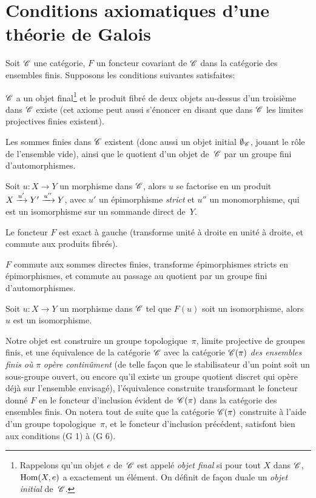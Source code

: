 \section{Conditions axiomatiques d'une th\'eorie de Galois}
\label{V.4}
Soit $\cal{C}$ une cat\'egorie, $F$ un foncteur covariant de
$\cal{C}$ dans la cat\'egorie des ensembles finis. Supposons les
conditions suivantes satisfaites:

\begin{enumerateb}

\item[(G 1)] $\cal{C}$ a un objet final\footnote{Rappelons qu'un objet
$e$ de~$\cal{C}$ est appel\'e \emph{objet final} si pour tout $X$ dans
$\cal{C}$, $\operatorname{Hom}(X,e)$ a exactement un \'el\'ement. On d\'efinit
de fa\c con duale un \emph{objet initial} de~$\cal{C}$.} et le produit
fibr\'e de deux objets au-dessus d'un troisi\`eme dans $\cal{C}$
existe (cet axiome peut aussi s'\'enoncer en disant que dans
$\cal{C}$ les limites projectives finies existent).

\item[(G 2)] Les sommes finies dans $\cal{C}$ existent (donc aussi un
objet initial $\emptyset_{\cal{C}}$, jouant le r\^ole de l'ensemble
vide), ainsi que le quotient d'un objet de~$\cal{C}$ par un groupe
fini d'automorphismes.

\item[(G 3)] Soit $u \colon X \to Y$ un morphisme dans $\cal{C}$,
alors $u$ se factorise en un produit $X\xrightarrow{u'} Y'\xrightarrow{u''} Y$, avec $u'$ un \'epimorphisme \emph{strict} et
$u''$ un monomorphisme, qui est un isomorphisme sur un sommande direct
de~$Y$.

\item[(G 4)]
Le foncteur $F$ est exact \`a gauche (\ie transforme unit\'e
\`a droite en unit\'e \`a droite, et commute aux produits
fibr\'es).

\item[(G 5)] $F$ commute aux sommes directes finies, transforme
\'epimorphismes stricts en \'epi\-mor\-phismes, et commute au
passage au quotient par un groupe fini d'automorphismes.

\item[(G 6)] Soit $u \colon X \to Y$ un morphisme dans $\cal{C}$ tel
que $F(u)$ soit un isomorphisme, alors $u$ est un isomorphisme.
\end{enumerateb}

Notre objet est construire un groupe topologique~$\pi$, limite
projective de groupes finis, et une \'equivalence de la
cat\'egorie $\cal{C}$ avec la cat\'egorie $\cal{C}(\pi)$
\label{indnot:eb}\emph{des ensembles finis où} $\pi$ \emph{opère
continûment} (\ie de telle fa\c con que le stabilisateur d'un
point soit un sous-groupe ouvert, ou encore qu'il existe un groupe
quotient discret qui op\`ere d\'ej\`a sur l'ensemble
envisag\'e), l'\'equivalence construite transformant le foncteur
donn\'e $F$ en le foncteur d'inclusion \'evident de~$\cal{C}(\pi)$
dans la cat\'egorie des ensembles finis. On notera tout de suite que
la cat\'egorie $\cal{C}(\pi)$ construite \`a l'aide d'un groupe
topologique~$\pi$, et le foncteur d'inclusion pr\'ec\'edent,
satisfont bien aux conditions (G 1) \`a (G 6).

